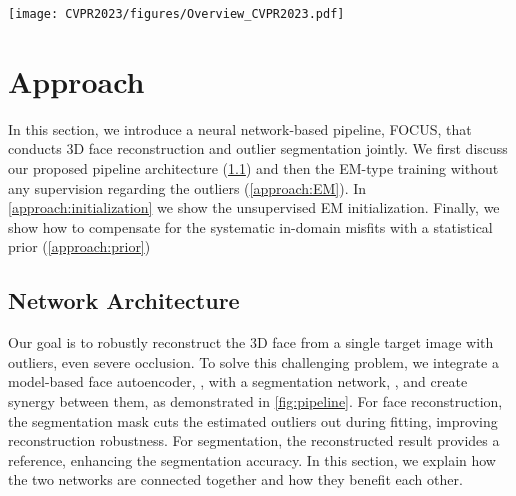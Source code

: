\documentclass[10pt,twocolumn,letterpaper]{article}
\begin{document}
\begin{figure*}
  \centering
  \footnotesize
  \texttt{[image: CVPR2023/figures/Overview\_CVPR2023.pdf]}
  
  \caption{Overview of our method. The solid single lines show the forward path. (a) Given a target image , the reconstruction network, , estimates the latent parameters and subsequently renders an image , containing only the face. Then,  and  are stacked and fed into the segmentation network, , which predicts the mask . The dashed lines show that  is used to mask out the estimated outliers in  and  to get assembly outlier-free images, namely  and . The double-lined arrows indicate the compared image pairs in the losses for  (orange) and losses for  (blue), as stated in \cref{approach:EM}.
  By training alternatively the two networks and exploiting the synergy between the segmentation and the reconstruction tasks, the proposed FOCUS pipeline is capable of both reconstructing faces even under severe occlusions robustly and conducting face segmentation. 
  (b) Predicting the face geometry  requires a single forward. The  is a simple subtraction operation as introduced in \cref{approach:prior}.
}
 \label{fig:pipeline}
\end{figure*}

\section{Approach}

In this section, we introduce a neural network-based pipeline, FOCUS, that conducts 3D face reconstruction and outlier segmentation jointly.
We first discuss our proposed pipeline architecture (\cref{approach:Network}) and then the EM-type training without any supervision regarding the outliers (\cref{approach:EM}). In \cref{approach:initialization} we show the unsupervised EM initialization.
Finally, we show how to compensate for the systematic in-domain misfits with a statistical prior (\cref{approach:prior})


\subsection{Network Architecture}
\label{approach:Network}
Our goal is to robustly reconstruct the 3D face from a single target image  with outliers, even severe occlusion.  
To solve this challenging problem, we integrate a model-based face autoencoder, , with a segmentation network, , and create synergy between them, as demonstrated in \cref{fig:pipeline}. For face reconstruction, the segmentation mask cuts the estimated outliers out during fitting, improving reconstruction robustness. For segmentation, the reconstructed result provides a reference, enhancing the segmentation accuracy. In this section, we explain how the two networks are connected together and how they benefit each other.
\end{document}
